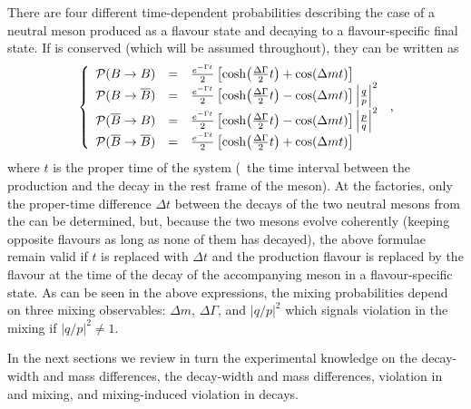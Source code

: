 There are four different time-dependent probabilities describing the 
case of a neutral \B meson produced 
as a flavour state and decaying to a flavour-specific final state.
If \CPT is conserved (which  
will be assumed throughout), they can be written as 
\begin{equation}
\left\{
\begin{array}{rcl}
{\cal P}(\B\to\B) & = &  \frac{e^{-\Gamma t}}{2} 
\left[ \cosh\!\left(\frac{\Delta\Gamma}{2}t\right) + \cos\!\left(\Delta m t\right)\right]  \\
{\cal P}(\B\to\bar{\B}) & = &  \frac{e^{-\Gamma t}}{2} 
\left[ \cosh\!\left(\frac{\Delta\Gamma}{2}t\right) - \cos\!\left(\Delta m t\right)\right] 
\left|\frac{q}{p}\right|^2 \\
{\cal P}(\bar{\B}\to\B) & = &  \frac{e^{-\Gamma t}}{2} 
\left[ \cosh\!\left(\frac{\Delta\Gamma}{2}t\right) - \cos\!\left(\Delta m t\right)\right] 
\left|\frac{p}{q}\right|^2 \\
{\cal P}(\bar{\B}\to\bar{\B}) & = &  \frac{e^{-\Gamma t}}{2} 
\left[ \cosh\!\left(\frac{\Delta\Gamma}{2}t\right) + \cos\!\left(\Delta m t\right)\right] 
\end{array} \right. \,,
\labe{oscillations}
\end{equation}
where $t$ is the proper time of the system (\ie\ the time interval between the production 
and the decay in the rest frame of the \B meson). 
At the \B factories, only the proper-time difference $\Delta t$ between the decays
of the two neutral \B mesons from the \Ups can be determined, but, 
because the two \B mesons evolve coherently (keeping opposite flavours as long as
none of them has decayed), the 
above formulae remain valid 
if $t$ is replaced with $\Delta t$ and the production flavour is replaced by the flavour 
at the time of the decay of the accompanying \B meson in a flavour-specific state.
As can be seen in the above expressions,
the mixing probabilities 
depend on three mixing observables:
$\Delta m$, $\Delta\Gamma$,
and $|q/p|^2$ which signals \CP violation in the mixing if $|q/p|^2 \ne 1$.

In the next sections we review in turn the experimental knowledge
on the \Bd decay-width and mass differences, 
the \Bs decay-width and mass differences,  
\CP violation in \Bd and \Bs mixing, and mixing-induced \CP violation in \Bs decays. 

 

